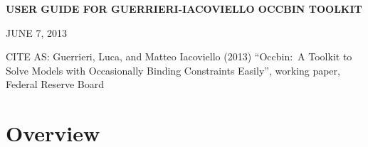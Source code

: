 \documentclass[12pt]{article}
\begin{document}
\setcounter{secnumdepth}{-1}%

\renewcommand{\baselinestretch}{1.05}
\normalsize%

\begin{center}
\textbf{USER GUIDE FOR GUERRIERI-IACOVIELLO OCCBIN TOOLKIT}

JUNE 7, 2013
\end{center}

CITE AS: Guerrieri, Luca, and Matteo Iacoviello (2013) ``Occbin:\ A Toolkit
to Solve Models with Occasionally Binding Constraints Easily'', working
paper, Federal Reserve Board

\bigskip

\section{Overview}
\end{document}
